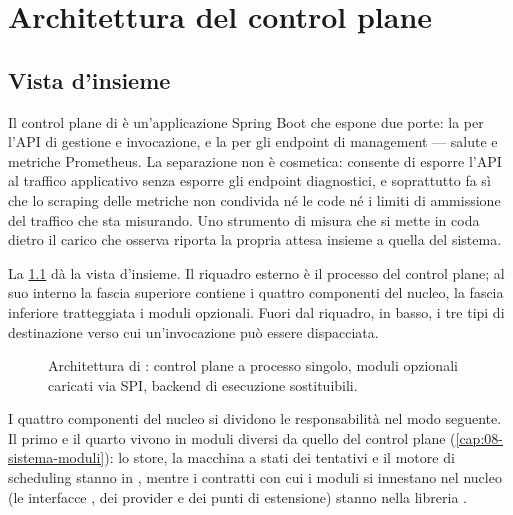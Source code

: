 \chapter{Architettura del control plane}
\label{cap:04-architettura-control-plane}

\section{Vista d'insieme}

Il control plane di \nf{} \`e un'applicazione Spring Boot che espone due porte:
la  per l'API di gestione e invocazione, e la  per gli
endpoint di management --- salute e metriche Prometheus. La separazione non \`e
cosmetica: consente di esporre l'API al traffico applicativo senza esporre gli
endpoint diagnostici, e soprattutto fa s\`i che lo scraping delle metriche non
condivida n\'e le code n\'e i limiti di ammissione del traffico che sta
misurando. Uno strumento di misura che si mette in coda dietro il carico che
osserva riporta la propria attesa insieme a quella del sistema.

La \cref{fig:architettura} d\`a la vista d'insieme. Il riquadro esterno \`e il
processo del control plane; al suo interno la fascia superiore contiene i quattro
componenti del nucleo, la fascia inferiore tratteggiata i moduli opzionali. Fuori
dal riquadro, in basso, i tre tipi di destinazione verso cui un'invocazione pu\`o
essere dispacciata.

\begin{figure}[htbp]
  \centering
  \resizebox{0.95\textwidth}{!}{}
  \caption{Architettura di \nf{}: control plane a processo singolo, moduli
  opzionali caricati via SPI, backend di esecuzione sostituibili.}
  \label{fig:architettura}
\end{figure}

I quattro componenti del nucleo si dividono le responsabilit\`a nel modo
seguente. Il primo e il quarto vivono in moduli diversi da quello del control
plane (\cref{cap:08-sistema-moduli}): lo store, la macchina a stati dei
tentativi e il motore di scheduling stanno in , mentre
i contratti con cui i moduli si innestano nel nucleo (le interfacce
, dei provider e dei punti di estensione) stanno nella
libreria .

